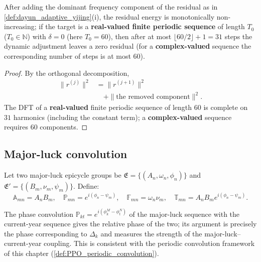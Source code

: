 \begin{proposition}\label{prop:dayun_adaptive_convergence_yijing}
After adding the dominant frequency component of the residual as in \cref{def:dayun_adaptive_yijing}(i), the residual energy is monotonically non-increasing; if the target is a \textbf{real-valued finite periodic sequence} of length $T_0$ ($T_0\in\mathbb N$) with $\delta=0$ (here $T_0=60$), then after at most $\lfloor 60/2\rfloor+1=31$ steps the dynamic adjustment leaves a zero residual (for a \textbf{complex-valued} sequence the corresponding number of steps is at most $60$).
\end{proposition}

\begin{proof}
By the orthogonal decomposition,
\[
\begin{aligned}
\|r^{(j)}\|^2 &= \|r^{(j+1)}\|^2\\
&\quad + \|\text{the removed component}\|^2.
\end{aligned}
\]
The DFT of a \textbf{real-valued} finite periodic sequence of length $60$ is complete on $31$ harmonics (including the constant term); a \textbf{complex-valued} sequence requires $60$ components.
\end{proof}

\subsection{Major-luck convolution}

\begin{definition}\label{def:dayun_convolution_yijing}
Let two major-luck epicycle groups be $\mathfrak E=\{(A_n,\omega_n,\phi_n)\}$ and $\mathfrak E'=\{(B_m,\nu_m,\psi_m)\}$. Define:
\[
\mathbb A_{mn}=A_nB_m,\quad \mathbb P_{mn}=e^{i(\phi_n-\psi_m)},\quad \mathbb F_{mn}=\omega_n\nu_m,\quad \mathbb T_{mn}=A_nB_m e^{i(\phi_n-\psi_m)}.
\]
\end{definition}

\begin{proposition}\label{prop:dayun_liunian_convolution_yijing}
The phase convolution $\mathbb P_{kt}=e^{i(\phi_k^M-\phi_t^N)}$ of the major-luck sequence with the current-year sequence gives the relative phase of the two; its argument is precisely the phase corresponding to $\Delta_k$ and measures the strength of the major-luck--current-year coupling. This is consistent with the periodic convolution framework of this chapter (\cref{def:PPO_periodic_convolution}).
\end{proposition}

